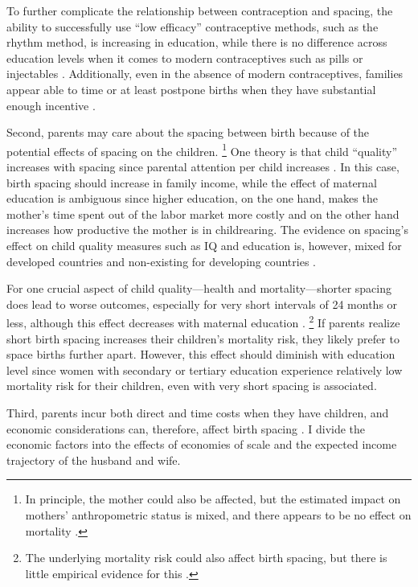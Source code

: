\documentclass[12pt,letterpaper]{article}
\begin{document}
To further complicate the relationship between contraception and spacing, the ability 
to successfully use ``low efficacy'' contraceptive methods, such as the rhythm method, 
is increasing in education, while there is no difference across education levels 
when it comes to modern contraceptives such as pills or injectables \citep{Rosenzweig1989}.
Additionally, even in the absence of modern contraceptives, families appear able to 
time or at least postpone births when they have substantial enough incentive 
\citep{Jayachandran2011,Alam2018}.


Second, parents may care about the spacing between birth because of the 
potential effects of spacing on the children.%
\footnote{
In principle, the mother could also be affected, but the estimated impact on 
mothers' anthropometric status is mixed, and there appears to be no 
effect on mortality 
\citep{Ronsmans1998,Menken2003,Dewey2007,Conde-Agudelo2012}.
}
One theory is that child ``quality'' increases with spacing 
since parental attention per child increases
\citep{Zajonc1975,Zajonc1976,Razin1980}.
In this case, birth spacing should increase in family income, while the 
effect of maternal education is ambiguous since higher education, on the 
one hand, makes the mother's time spent out of the labor market more 
costly and on the other hand increases how productive the mother is 
in childrearing.
The evidence on spacing's effect on child quality measures such as IQ 
and education is, however, mixed for developed countries and non-existing 
for developing countries
\citep{Powell1993,Pettersson-Lidbom2009,Buckles2012,Barclay2017}.

For one crucial aspect of child quality---health and mortality---shorter spacing 
does lead to worse outcomes, especially for very short intervals of 24 months 
or less, although this effect decreases with maternal education
\citep{Whitworth2002,Conde-Agudelo2006,Conde-Agudelo2012,Molitoris2019}.%
\footnote{
The underlying mortality risk could also affect birth spacing, but
there is little empirical evidence for this 
\citep{Newman1983,Newman1988,Bhalotra2008}.
}
If parents realize short birth spacing increases their children's mortality risk, 
they likely prefer to space births further apart.
However, this effect should diminish with education level since women with 
secondary or tertiary education experience relatively low mortality risk for 
their children, even with very short spacing is associated.


Third, parents incur both direct and time costs when they have children, 
and economic considerations can, therefore, affect birth spacing 
\citep{Hotz1997,schultz97}.
I divide the economic factors into the effects of economies of scale and
the expected income trajectory of the husband and wife.
\end{document}
